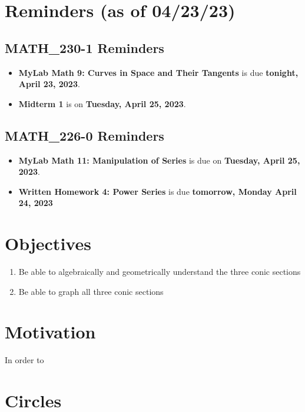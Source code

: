 \documentclass{report}
\begin{document}
\begin{sloppypar}
\section{Reminders (as of 04/23/23)}
\subsection{MATH\_230-1 Reminders}
\begin{itemize}
  \item \textbf{MyLab Math 9: Curves in Space and Their
        Tangents} is due \textbf{tonight, April 23, 2023}.
  \item \textbf{Midterm 1} is on \textbf{Tuesday, April
        25, 2023}.

\end{itemize}
\subsection{MATH\_226-0 Reminders}
\begin{itemize}
  \item \textbf{MyLab Math 11: Manipulation of Series}
        is due on \textbf{Tuesday, April 25, 2023}.
  \item \textbf{Written Homework 4: Power Series} is due
        \textbf{tomorrow, Monday April 24, 2023}
\end{itemize}




\section{Objectives}
\begin{enumerate}
  \item Be able to algebraically and geometrically
        understand the three conic sections
  \item Be able to graph all three conic sections

\end{enumerate}

\section{Motivation}
In order to
\section{Circles}
\begin{center}
\end{center}


\end{sloppypar}
\end{document}

